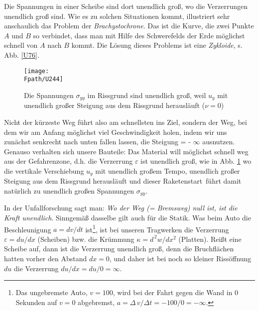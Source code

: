 {{Die Spannungen in einer Scheibe sind dort unendlich gro{\ss}, wo die Verzerrungen unendlich gro{\ss} sind. Wie es zu solchen Situationen kommt, illustriert sehr anschaulich das Problem der {\em Brachystochrone\/}. Das ist die Kurve, die zwei Punkte $A$ und $B$ so verbindet, dass man mit Hilfe des Schwerefelds der Erde m\"{o}glichst schnell von $A$ nach $B$ kommt. Die L\"{o}sung dieses Problems ist eine {\em Zykloide\/}, s. Abb. \ref{U76}.
\begin{figure}[tbp] \centering
\centering
\if {} \sidecaption \fi
\texttt{[image: \\Fpath/U244]}
\caption{Die Spannungen $\sigma_{yy}$ im Rissgrund sind unendlich gro{\ss}, weil $u_y$ mit unendlich gro{\ss}er Steigung aus dem Rissgrund herausl\"{a}uft ($\nu = 0$)} \label{U244}
\end{figure}%

Nicht der k\"{u}rzeste Weg f\"{u}hrt also am schnellsten ins Ziel, sondern der Weg, bei dem wir am Anfang  m\"{o}glichst viel Geschwindigkeit holen, indem wir uns zun\"{a}chst senkrecht nach unten fallen lassen,  die Steigung = - $\infty$ ausnutzen. Genauso verhalten sich unsere Bauteile: Das Material will m\"{o}glichst schnell weg aus der Gefahrenzone, d.h. die Verzerrung $\varepsilon$ ist unendlich gro{\ss}, wie in Abb. \ref{U244} wo die vertikale Verschiebung $u_y$ mit unendlich gro{\ss}em Tempo, unendlich gro{\ss}er Steigung aus dem Rissgrund herausl\"{a}uft und dieser \glq Raketenstart\grq\ f\"{u}hrt damit nat\"{u}rlich zu unendlich gro{\ss}en Spannungen $\sigma_{yy}$.

In der Unfallforschung sagt man: {\em  Wo der Weg (= Bremsweg) null ist, ist die Kraft unendlich\/}. Sinngem\"{a}{\ss} dasselbe gilt auch f\"{u}r die Statik. Was beim Auto die Beschleunigung $a = dv/dt$ ist\footnote{Das ungebremste Auto, $v = 100$, wird bei der Fahrt gegen die Wand in $ 0$ Sekunden auf $v = 0$ abgebremst, $ a = \Delta\,v/\Delta t = -100/0 = -\infty$.}, ist bei unseren Tragwerken die Verzerrung $\varepsilon = du/dx$ (Scheiben) bzw. die Kr\"{u}mmung $\kappa = d^{\,2}w/dx^2$ (Platten). Rei{\ss}t eine Scheibe auf, dann ist die Verzerrung unendlich gro{\ss}, denn die Bruchfl\"{a}chen hatten vorher den Abstand $dx = 0$, und daher ist bei noch so kleiner Riss\"{o}ffnung $du$ die Verzerrung $du/dx = du/0 = \infty$.

}}
